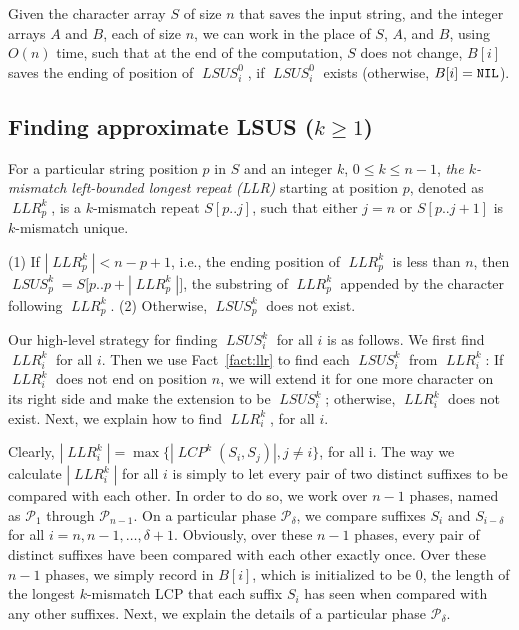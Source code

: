 \documentclass[11pt]{llncs}
\DeclareMathOperator{\lsus}{\mathit{LSUS}}
\DeclareMathOperator{\lcp}{\mathit{LCP}}
\DeclareMathOperator{\llr}{\mathit{LLR}}
\begin{document}
\begin{lemma}
\label{lem:lsus-exact}
  Given the character array $S$ of size $n$ that saves the input string, 
  and the integer arrays $A$ and $B$, each of size $n$, we can work
  in the place of $S$, $A$, and $B$, using $O(n)$ time, such that at
  the end of the computation, $S$ does not change, $B[i]$ saves the
  ending of position of $\lsus_i^0$, if $\lsus_i^0$ exists (otherwise,
  $B[i]={\tt NIL}$).
\end{lemma}



\subsection{Finding approximate LSUS ($k \geq 1$)}
\label{sec:lsus-k}

\begin{definition}
\label{def:llr}
For a particular string position $p$ in $S$ 
and an integer $k$, $0\leq k\leq n-1$, 
\emph{the $k$-mismatch left-bounded longest repeat (LLR)}
starting at position $p$, denoted as $\llr_p^k$, is a $k$-mismatch
repeat $S[p..j]$, 
such that either $j=n$ or $S[p .. j+1]$ is
$k$-mismatch unique.   
\end{definition}

\begin{fact}
\label{fact:llr}
(1) If $|\llr_p^k|< n - p + 1$, i.e., the ending position of $\llr_p^k$ is
less than $n$, then $\lsus_p^k = S\bigl[p ..
p+|\llr_p^k|\bigr]$, the substring of
$\llr_p^k$ appended by the character following $\llr_p^k$.
(2) Otherwise, $\lsus_p^k$ does not exist. 
\end{fact}

Our high-level strategy for finding $\lsus_i^k$ for all $i$ is as
follows.  We first find $\llr_i^k$ for all $i$. Then we use
Fact~\ref{fact:llr} to find each $\lsus_i^k$ from $\llr_i^k$: If
$\llr_i^k$ does not end on position $n$, we will extend it 
for one more character on its right side and make the extension to be
$\lsus_i^k$; otherwise, $\llr_i^k$ does not exist. Next, we 
explain how to find $\llr_i^k$, for all $i$. 

Clearly, $|\llr_i^k| = \max\{|\lcp^k(S_i, S_j)|, j\neq i\}$, for all
i. The way we calculate $|\llr_i^k|$ for all $i$ is simply to let
every pair of two distinct suffixes to be compared with each other. In
order to do so, we work over $n-1$ phases, named as $\mathcal{P}_1$
through $\mathcal{P}_{n-1}$. On a particular phase
$\mathcal{P}_\delta$, we compare suffixes $S_i$ and $S_{i-\delta}$ for
all $i=n,n-1,\ldots,\delta+1$. Obviously, over these $n-1$ phases,
every pair of distinct suffixes have been compared with each other
exactly once. 
Over these $n-1$ phases, we simply record in $B[i]$, which is
initialized to be $0$, the length of 
the longest $k$-mismatch LCP that each suffix $S_i$
has seen when compared with any other suffixes. 
Next, we explain the details of a particular phase
$\mathcal{P}_\delta$.
\end{document}
